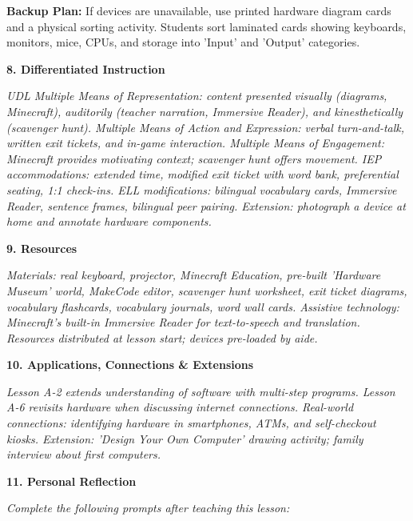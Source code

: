 \documentclass[11pt,letterpaper]{article}
\begin{document}
\textbf{Backup Plan: }If devices are unavailable, use printed hardware diagram cards and a physical sorting activity. Students sort laminated cards showing keyboards, monitors, mice, CPUs, and storage into 'Input' and 'Output' categories.

\newpage
\textbf{8. Differentiated Instruction}

\textit{UDL Multiple Means of Representation: content presented visually (diagrams, Minecraft), auditorily (teacher narration, Immersive Reader), and kinesthetically (scavenger hunt). Multiple Means of Action and Expression: verbal turn-and-talk, written exit tickets, and in-game interaction. Multiple Means of Engagement: Minecraft provides motivating context; scavenger hunt offers movement. IEP accommodations: extended time, modified exit ticket with word bank, preferential seating, 1:1 check-ins. ELL modifications: bilingual vocabulary cards, Immersive Reader, sentence frames, bilingual peer pairing. Extension: photograph a device at home and annotate hardware components.}

\textbf{9. Resources}

\textit{Materials: real keyboard, projector, Minecraft Education, pre-built 'Hardware Museum' world, MakeCode editor, scavenger hunt worksheet, exit ticket diagrams, vocabulary flashcards, vocabulary journals, word wall cards. Assistive technology: Minecraft's built-in Immersive Reader for text-to-speech and translation. Resources distributed at lesson start; devices pre-loaded by aide.}

\textbf{10. Applications, Connections \& Extensions}

\textit{Lesson A-2 extends understanding of software with multi-step programs. Lesson A-6 revisits hardware when discussing internet connections. Real-world connections: identifying hardware in smartphones, ATMs, and self-checkout kiosks. Extension: 'Design Your Own Computer' drawing activity; family interview about first computers.}

\textbf{11. Personal Reflection}

\textit{Complete the following prompts after teaching this lesson:}
\end{document}
